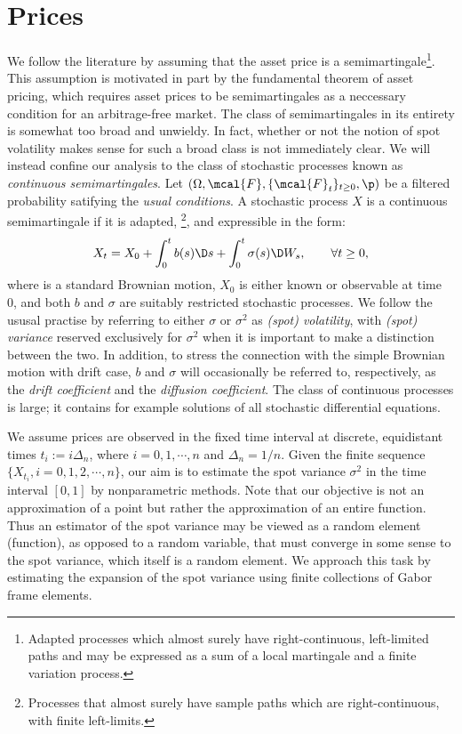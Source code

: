 \section{Prices} \label{sec:model}
We follow the literature by assuming that the asset price is a semimartingale\footnote{Adapted processes which almost surely have  right-continuous, left-limited paths and  may be expressed as a sum of a local martingale and a finite variation process.}. This assumption is motivated in part by the fundamental theorem of asset pricing, which requires asset prices to be semimartingales as a neccessary condition for an arbitrage-free market. The class of semimartingales in its entirety  is somewhat too broad and  unwieldy. In fact, whether or not the notion of spot volatility makes sense for such a broad class is not immediately clear. We will instead confine our analysis to the class of stochastic processes known as  \emph{continuous \ito  semimartingales}. Let $(\Omega, \mcal{F}, \{\mcal{F}_t\}_{t \ge 0}, \p)$ be a filtered probability satifying the \emph{usual conditions}. A stochastic process $X$ is a continuous \ito semimartingale if it is adapted, \cadlag\footnote{Processes that almost surely  have sample paths which  are  right-continuous, with finite left-limits.}, and expressible in the form:
\begin{align}
  X_t = X_0 + \int_0^t b(s) \D s + \int_0^t \sigma(s) \D W_s, \qquad \forall t \ge 0,
  \label{eq:semimartingale}
\end{align}
where \sbm is a standard Brownian motion,  $X_0$ is either known or observable at time 0, and both $b$ and $\sigma$ are suitably restricted stochastic processes. We follow the ususal practise by referring to either $\sigma$ or $\sigma^2$  as \emph{(spot) volatility}, with \emph{(spot) variance} reserved exclusively for $\sigma^2$ when it is important to make a  distinction between the two. In addition, to stress the connection with the simple Brownian motion with drift case, $b$ and $\sigma$ will occasionally be referred to, respectively, as the \emph{drift coefficient} and the \emph{diffusion coefficient}. 
 The class of continuous \ito processes is large; it contains for example   solutions of all stochastic differential equations.

 We assume prices are observed in the fixed time interval \domain at discrete, equidistant times $t_i := i\Delta_n$, where  $i= 0,1,\cdots,n$ and $\Delta_n = 1/n$. Given the finite sequence  $\{X_{t_i}, i=0,1,2,\cdots,n\}$, our aim is to estimate the spot variance $\sigma^2$ in the time interval $[0,1]$ by nonparametric methods. Note that our objective is not an approximation of a point but rather the approximation of an entire function. Thus an estimator of the spot variance may be viewed as a  random element (function), as opposed to a random variable, that must converge in some sense to the spot variance, which itself is a random element. We approach this task  by estimating the expansion of the spot variance using  finite collections of  Gabor frame elements.
